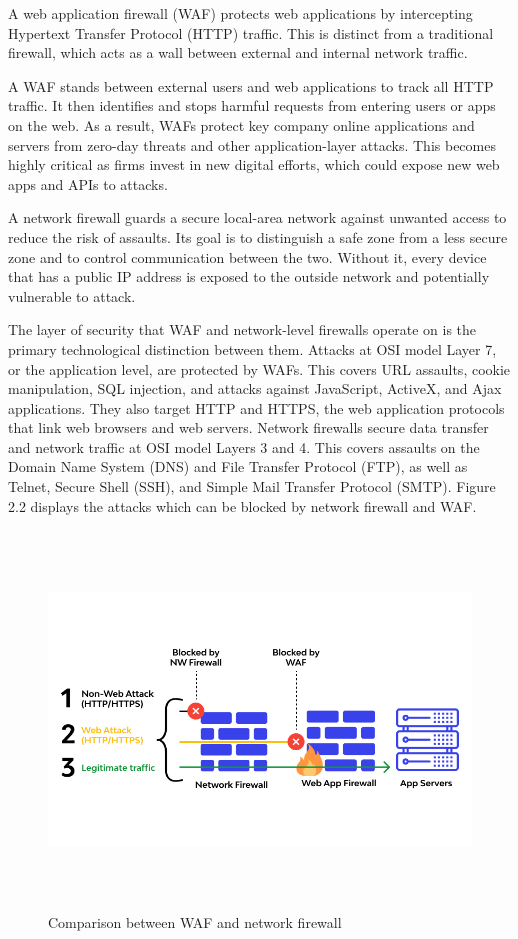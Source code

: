 A web application firewall (WAF) protects web applications by intercepting Hypertext Transfer Protocol (HTTP) traffic. This is distinct from a traditional firewall, which acts as a wall between external and internal network traffic.

A WAF stands between external users and web applications to track all HTTP traffic. It then identifies and stops harmful requests from entering users or apps on the web. As a result, WAFs protect key company online applications and servers from zero-day threats and other application-layer attacks. This becomes highly critical as firms invest in new digital efforts, which could expose new web apps and APIs to attacks.

A network firewall guards a secure local-area network against unwanted access to reduce the risk of assaults. Its goal is to distinguish a safe zone from a less secure zone and to control communication between the two. Without it, every device that has a public IP address is exposed to the outside network and potentially vulnerable to attack.

The layer of security that WAF and network-level firewalls operate on is the primary technological distinction between them. Attacks at OSI model Layer 7, or the application level, are protected by WAFs. This covers URL assaults, cookie manipulation, SQL injection, and attacks against JavaScript, ActiveX, and Ajax applications. They also target HTTP and HTTPS, the web application protocols that link web browsers and web servers. Network firewalls secure data transfer and network traffic at OSI model Layers 3 and 4. This covers assaults on the Domain Name System (DNS) and File Transfer Protocol (FTP), as well as Telnet, Secure Shell (SSH), and Simple Mail Transfer Protocol (SMTP). Figure 2.2 displays the attacks which can be blocked by network firewall and WAF.

\begin{figure}[h!]
	\centering
	\includegraphics[width=\linewidth, height=10cm,keepaspectratio]{figures/waf3.png}
	\caption{Comparison between WAF and network firewall}
\end{figure}
\newpage

